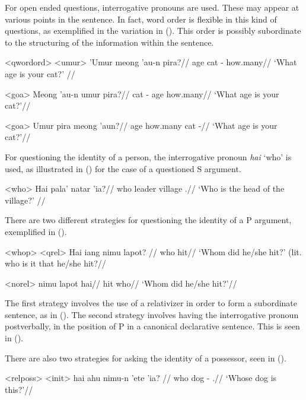 \documentclass[../hewa_main-subfiles.tex]{subfiles}
\begin{document}
For open ended questions, interrogative pronouns are used. These may appear at various points in the sentence. In fact, word order is flexible in this kind of questions, as exemplified in the variation in (). This order is possibly subordinate to the structuring of the information within the sentence.

\pex<qwordord> %
\a<umur>
\begingl %
\gla 'Umur meong 'au-n pira?//
\glb age cat \Second{}\Sg{}-\Poss{} how.many//
\glft `What age is your cat?' // 
\endgl 

\a<goa> %
\begingl %
\gla Meong 'au-n umur pira?//
\glb cat \Second{}\Sg{}-\Poss{} age how.many//
\glft `What age is your cat?'// 
\endgl

\a<goa> %
\begingl %
\gla Umur pira meong 'aun?//
\glb age how.many cat \Second{}\Sg{}-\Poss{}//
\glft `What age is your cat?'// 
\endgl
\xe


For questioning the identity of a person, the interrogative pronoun \textit{hai} `who' is used, as illustrated in () for the case of a questioned S argument.

\ex<who>
\begingl %
\gla Hai pala' natar 'ia?//
\glb who leader village \Def{}.\Sg{}//
\glft `Who is the head of the village?' //
\endgl
\xe

There are two different strategies for questioning the identity of a P argument, exemplified in (). 

\pex<whop> %
\a<qrel> %
\begingl %
\gla Hai iang nimu lapot? //
\glb who \Rel{} \Third{}\Sg{} hit//
\glft `Whom did he/she hit?' (lit. who is it that he/she hit?//
\endgl

\a<norel> %
\begingl %
\gla nimu lapot hai//
\glb \Third{}\Sg{} hit who//
\glft `Whom did he/she hit?'// 
\endgl
\xe

The first strategy involves the use of a relativizer in order to form a subordinate sentence, as in (). The second strategy involves having the interrogative pronoun postverbally,  in the position of P in a canonical declarative sentence. This is seen in ().

There are also two strategies for asking the identity of a possessor, seen in ().

\pex<relposs> %
\a<init> %
\begingl %
\gla hai ahu nimu-n 'ete 'ia? //
\glb who dog \Third{}\Sg{}-\Poss{} \Dem{} \Def{}.\Sg{}//
\glft `Whose dog is this?'//
\endgl
\end{document}
